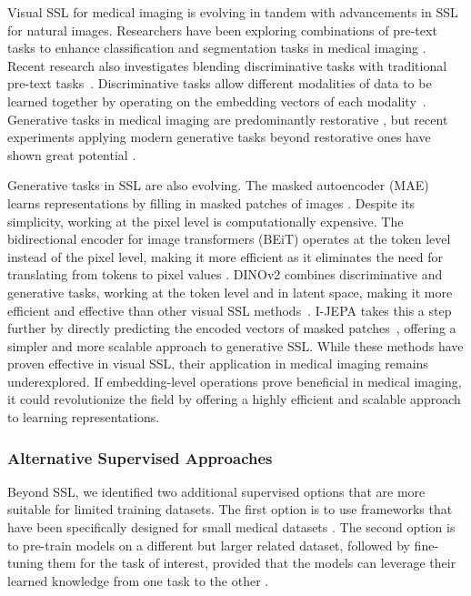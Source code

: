 \documentclass[a4paper,11pt,oneside]{report}
\begin{document}
Visual SSL for medical imaging is evolving in tandem with advancements in SSL for natural images. Researchers have been exploring combinations of pre-text tasks to enhance classification and segmentation tasks in medical imaging \cite{Noroozi2016, Zhuang2019}. Recent research also investigates blending discriminative tasks with traditional pre-text tasks~\cite{Zhou2021, Zhang2021, Dufumier2021, Taleb2020, Zhang2021, He2022Intra, Ren2022}. Discriminative tasks allow different modalities of data to be learned together by operating on the embedding vectors of each modality~\cite{Radford2021CLIP, Hager2023}. Generative tasks in medical imaging are predominantly restorative \cite{Pathak2016, Chen2019, Zhou2021, Tang2022, Haghighi2021, Haghighi2024}, but recent experiments applying modern generative tasks beyond restorative ones have shown great potential \cite{Baharoon2023general, Zhou2022}.

Generative tasks in SSL are also evolving.  The masked autoencoder (MAE) learns representations by filling in masked patches of images \cite{He2022}. Despite its simplicity, working at the pixel level is computationally expensive. The bidirectional encoder for image transformers (BEiT) operates at the token level instead of the pixel level, making it more efficient as it eliminates the need for translating from tokens to pixel values \cite{Bao2022beit}. DINOv2 combines discriminative and generative tasks, working at the token level and in latent space, making it more efficient and effective than other visual SSL methods~\cite{Oquab2024dinov}. I-JEPA takes this a step further by directly predicting the encoded vectors of masked patches~\cite{Assran2023}, offering a simpler and more scalable approach to generative SSL. While these methods have proven effective in visual SSL, their application in medical imaging remains underexplored. If embedding-level operations prove beneficial in medical imaging, it could revolutionize the field by offering a highly efficient and scalable approach to learning representations.

\subsubsection{Alternative Supervised Approaches}
Beyond SSL, we identified two additional supervised options that are more suitable for limited training datasets. The first option is to use frameworks that have been specifically designed for small medical datasets \cite{Isensee2020}. The second option is to pre-train models on a different but larger related dataset, followed by fine-tuning them for the task of interest, provided that the models can leverage their learned knowledge from one task to the other \cite{Ghosh2024, Khaled2023}.
\end{document}
